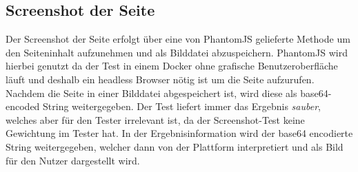 \subsection{Screenshot der Seite}
Der Screenshot der Seite erfolgt über eine von PhantomJS gelieferte Methode um den Seiteninhalt aufzunehmen und als Bilddatei abzuspeichern. PhantomJS wird hierbei genutzt da der Test in einem Docker ohne grafische Benutzeroberfläche läuft und deshalb ein headless Browser nötig ist um die Seite aufzurufen. Nachdem die Seite in einer Bilddatei abgespeichert ist, wird diese als base64-encoded String weitergegeben. Der Test liefert immer das Ergebnis \textit{sauber}, welches aber für den Tester irrelevant ist, da der Screenshot-Test keine Gewichtung im Tester hat. In der Ergebnisinformation wird der base64 encodierte String weitergegeben, welcher dann von der Plattform interpretiert und als Bild für den Nutzer dargestellt wird.
